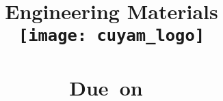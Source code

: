 
\title{
\vspace{2in}
\textmd{\textbf{Engineering Materials}}\\
\texttt{[image: cuyam\_logo]}\\
\textmd{\textbf{\hmwkTitle}}\\
\normalsize\vspace{0.1in}\small{Due\ on\ \hmwkDueDate}\\
\vspace{0.1in}\large{\textit{\hmwkClassInstructor\ \hmwkClassTime}}
\vspace{2in}
}

\author{\textbf{\hmwkAuthorName}}
\date{} %




\maketitle
\newpage


